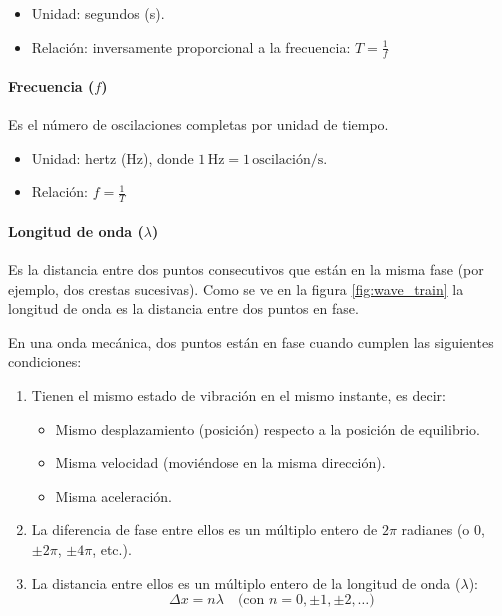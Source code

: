 \begin{itemize}
  \item Unidad: segundos (s).
  \item Relación: inversamente proporcional a la frecuencia: \(T = \frac{1}{f}\)
\end{itemize}

\paragraph{Frecuencia (\(f\))}

Es el número de oscilaciones completas por unidad de tiempo.

\begin{itemize}
  \item Unidad: hertz (Hz), donde \(1\, \text{Hz} = 1\, \text{oscilación/s}\).
  \item Relación: \(f = \frac{1}{T}\)
\end{itemize}

\paragraph{Longitud de onda (\(\lambda\))}

Es la distancia entre dos puntos consecutivos que están en la misma fase (por ejemplo, dos crestas sucesivas). Como se ve en la figura \ref{fig:wave_train} la longitud de onda es la distancia entre dos puntos en fase. 

En una onda mecánica, dos puntos están en fase cuando cumplen las siguientes condiciones:

\begin{enumerate}
  \item Tienen el mismo estado de vibración en el mismo instante, es decir:
    \begin{itemize}
      \item Mismo desplazamiento (posición) respecto a la posición de equilibrio.
      \item Misma velocidad (moviéndose en la misma dirección).
      \item Misma aceleración.
    \end{itemize}
  \item La diferencia de fase entre ellos es un múltiplo entero de \(2\pi\) radianes (o \(0\), \(\pm 2\pi\), \(\pm 4\pi\), etc.). 
  \item La distancia entre ellos es un múltiplo entero de la longitud de onda (\(\lambda\)):
   \[
   \Delta x = n\lambda \quad \text{(con \(n = 0, \pm 1, \pm 2, \dots\))}
   \]
\end{enumerate}

